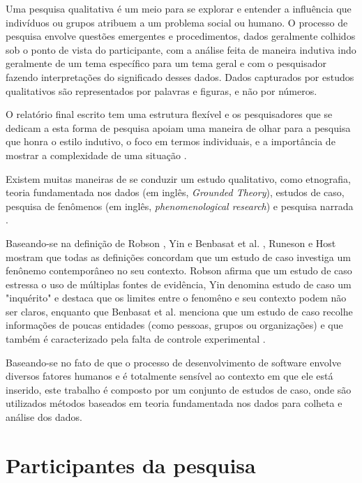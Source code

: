 Uma pesquisa qualitativa é um meio para se explorar e entender a influência que 
indivíduos ou grupos atribuem a um problema social ou humano. O processo de
pesquisa envolve questões emergentes e procedimentos, dados geralmente colhidos
sob o ponto de vista do participante, com a análise feita de maneira indutiva
indo  geralmente de um tema específico para um tema geral e com o pesquisador
fazendo interpretações do significado desses dados. Dados capturados por estudos
qualitativos são representados por palavras e figuras, e não por números.

O relatório final escrito tem uma estrutura flexível e os pesquisadores que se
dedicam a esta forma de pesquisa apoiam uma maneira de olhar para a pesquisa que
honra o estilo indutivo, o foco em termos individuais, e a importância de mostrar a 
complexidade de uma situação \cite{creswell}. 

Existem muitas maneiras de se conduzir um estudo qualitativo, como etnografia,
teoria fundamentada nos dados (em inglês, \textit{Grounded Theory}), estudos de 
caso, pesquisa de fenômenos (em inglês, \textit{phenomenological research}) e 
pesquisa narrada \cite{creswell}. 

Baseando-se na definição de Robson \cite{robson}, Yin \cite{yin} e Benbasat et
al. \cite{benbasat}, Runeson e Host mostram que todas as definições concordam
que um estudo de caso investiga um fenônemo contemporâneo no seu contexto. 
Robson afirma que um estudo de caso estressa o uso de múltiplas fontes de
evidência, Yin denomina estudo de caso um "inquérito" e destaca que os limites 
entre o fenomêno e seu contexto podem não ser claros, enquanto que Benbasat et
al. menciona que um estudo de caso recolhe informações de poucas entidades 
(como pessoas, grupos ou organizações) e que também é caracterizado pela  falta
de controle experimental \cite{guidelines-case-study}.

Baseando-se no fato de que o processo de desenvolvimento de software envolve 
diversos fatores humanos e é totalmente sensível ao contexto em que ele está 
inserido, este trabalho é composto por um conjunto de estudos de caso, onde são 
utilizados métodos baseados em teoria fundamentada nos dados para colheta e
análise dos dados.

\section{Participantes da pesquisa}
\label{sec:planejamento-participantes}

